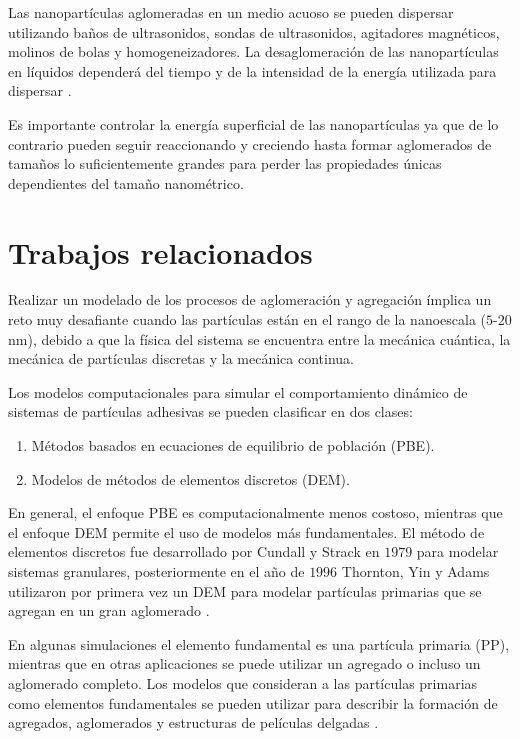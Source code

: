 \documentclass[3p,times,twocolumn]{elsarticle}
\begin{document}
Las nanopartículas aglomeradas en un medio acuoso se pueden dispersar utilizando baños de ultrasonidos, sondas de ultrasonidos, agitadores magnéticos, molinos de bolas y homogeneizadores. La desaglomeración de las nanopartículas en líquidos dependerá del tiempo y de la intensidad de la energía utilizada para dispersar \cite{4}.

Es importante controlar la energía superficial de las nanopartículas ya que de lo contrario pueden seguir reaccionando y creciendo hasta formar aglomerados de tamaños lo suficientemente grandes para perder las propiedades únicas dependientes del tamaño nanométrico. 

\section{Trabajos relacionados}
Realizar un modelado de los procesos de aglomeración y agregación ímplica un reto muy desafiante cuando las partículas están en el rango de la nanoescala ($5$-$20$ nm), debido a que la física del sistema se encuentra entre la mecánica cuántica, la mecánica de partículas discretas y la mecánica continua.

Los modelos computacionales para simular el comportamiento dinámico de sistemas de partículas adhesivas se pueden clasificar en dos clases:
\begin{enumerate}
    \item Métodos basados en ecuaciones de equilibrio de población (PBE).
    \item Modelos de métodos de elementos discretos (DEM). 
\end{enumerate}
  
En general, el enfoque PBE es computacionalmente menos costoso, mientras que el enfoque DEM permite el uso de modelos más fundamentales. El método de elementos discretos fue desarrollado por Cundall y Strack en $1979$ para modelar sistemas granulares, posteriormente en el año de $1996$ Thornton, Yin y Adams utilizaron por primera vez un DEM para modelar partículas primarias que se agregan en un gran aglomerado \cite{5}.

En algunas simulaciones el elemento fundamental es una partícula primaria (PP), mientras que en otras aplicaciones se puede utilizar un agregado o incluso un aglomerado completo. Los modelos que consideran a las partículas primarias como elementos fundamentales se pueden utilizar para describir la formación de agregados, aglomerados y estructuras de películas delgadas \cite{5}.
\end{document}
